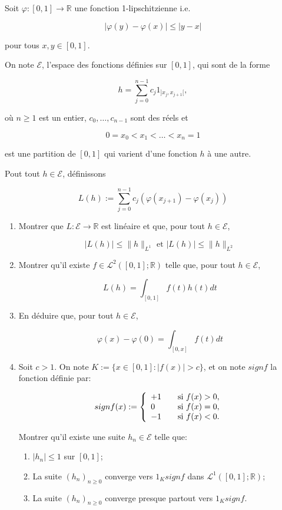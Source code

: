 \documentclass[10pt,a4paper,oneside]{article}
\newenvironment{exercice}[1][Exercice]{\begin{trivlist}
\item[\hskip \labelsep {\bfseries #1}]}{\end{trivlist}}
\begin{document}
\begin{exercice}
Soit $\varphi : [0,1] \to \mathbb{R}$ une fonction 1-lipschitzienne i.e.

\[ |\varphi(y) - \varphi(x)| \leq |y -x| \]

pour tous $x,y \in [0,1]$.

On note $\mathcal{E}$, l'espace des fonctions définies sur $[0,1]$, qui sont de la forme

\[ h = \sum_{j = 0}^{n - 1} c_j 1_{]x_j,x_{j + 1}[}, \]

où $n \geq 1$ est un entier, $c_0, \ldots, c_{n - 1}$ sont des réels et

\[ 0 = x_0 < x_1 < \ldots < x_n = 1 \]

est une partition de $[0,1]$ qui varient d'une fonction $h$ à une autre.

Pout tout $h \in \mathcal{E}$, définissons

\[ L(h) := \sum_{j = 0}^{n - 1} c_j (\varphi(x_{j + 1}) - \varphi(x_j)) \]

\begin{enumerate}
\item
Montrer que $L: \mathcal{E} \to \mathbb{R}$ est linéaire et que, pour tout $h \in \mathcal{E}$,

\[ |L(h)| \leq \| h \|_{L^1} \text{ et } |L(h)| \leq \| h \|_{L^2} \]

\item
Montrer qu'il existe $f \in \mathcal{L}^2([0,1];\mathbb{R})$ telle que, pour tout $h \in \mathcal{E}$,

\[ L(h) = \int_{[0,1]}f(t)h(t)dt \]

\item
En déduire que, pour tout $h \in \mathcal{E}$,

\[ \varphi(x) - \varphi(0) = \int_{[0,x]} f(t)dt \]

\item
Soit $c > 1$. On note $K := \{ x \in [0,1] : |f(x)| > c \}$, et on note $signf$ la fonction définie par:

\[ signf(x) := \left\{ 
  \begin{array}{l l l }
    +1 & \quad \text{si }f(x) > 0,\\
    0 & \quad \text{si }f(x) = 0,\\
    -1 & \quad \text{si }f(x) < 0.
  \end{array} \right.\]

Montrer qu'il existe une suite $h_n \in \mathcal{E}$ telle que:

\begin{enumerate}
\item
$|h_n| \leq 1$ sur $[0,1]$;
\item
La suite $(h_n)_{n \geq 0}$ converge vers $1_{K}signf$ dans $\mathcal{L}^1([0,1];\mathbb{R})$;
\item
La suite $(h_n)_{n \geq 0}$ converge presque partout vers $1_{K}signf$.
\end{enumerate}

\end{enumerate}
\end{exercice}
\end{document}
